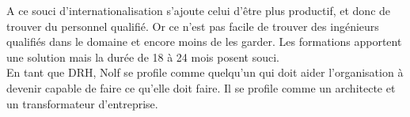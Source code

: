 \documentclass[12pt]{report}
\begin{document}
A ce souci d'internationalisation s'ajoute celui d'être plus productif, et donc de trouver du personnel qualifié. Or ce n'est pas facile de trouver des ingénieurs qualifiés dans le domaine et encore moins de les garder. Les formations apportent une solution mais la durée de 18 à 24 mois posent souci.\\ 

En tant que DRH, Nolf se profile comme quelqu'un qui doit aider l'organisation à devenir capable de faire ce qu'elle doit faire. Il se profile comme un architecte et un transformateur d'entreprise.
\end{document}

